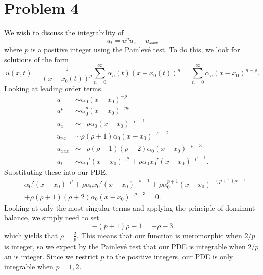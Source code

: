 \documentclass{article}
\newcommand{\Pain}{Painlev\'{e} }
\begin{document}
\section{Problem 4}
We wish to discuss the integrability of 
\[
u_t=u^p u_x+u_{xxx}
\]
where $p$ is a positive integer using the Painlev\'e test. To do this, we look for solutions of the form
\[
u(x,t)=\frac{1}{(x-x_0(t))^\rho}\sum_{n=0}^{\infty}\alpha_n(t)(x-x_0(t))^n=\sum_{n=0}^{\infty}\alpha_n(x-x_0)^{n-\rho}.
\]
Looking at leading order terms,
\begin{align*}
u&\sim\alpha_0(x-x_0)^{-\rho}\\
u^p&\sim\alpha_0^p(x-x_0)^{-p\rho}\\
u_x&\sim-\rho\alpha_0(x-x_0)^{-\rho-1}\\
u_{xx}&\sim \rho(\rho+1)\alpha_0(x-x_0)^{-\rho-2}\\
u_{xxx}&\sim-\rho(\rho+1)(\rho+2)\alpha_0(x-x_0)^{-\rho-3}\\
u_t&\sim\alpha_0'(x-x_0)^{-\rho}+\rho\alpha_0x_0'(x-x_0)^{-\rho-1}.
\end{align*}
Substituting these into our PDE,
\begin{align*}
&\alpha_0'(x-x_0)^{-\rho}+\rho\alpha_0x_0'(x-x_0)^{-\rho-1}+\rho\alpha_0^{p+1}(x-x_0)^{-(p+1)\rho-1}\\&+
\rho(\rho+1)(\rho+2)\alpha_0(x-x_0)^{-\rho-3}=0.
\end{align*}
Looking at only the most singular terms and applying the principle of dominant balance, we simply need to set
\[
-(p+1)\rho-1=-\rho-3
\]
which yields that $\rho=\frac{2}{p}$. This means that our function is meromorphic when $2/p$ is integer, so we expect by the \Pain test that our PDE is integrable when $2/p$ an is integer. Since we restrict $p$ to the positive integers, our PDE is only integrable when $p=1,2$.
\end{document}
